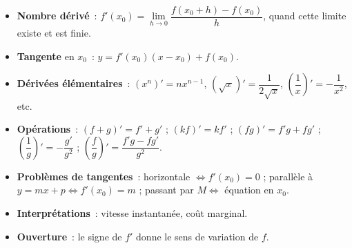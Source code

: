 \documentclass[11pt]{article}
\begin{document}
\begin{aretenir}
\begin{itemize}
\item \textbf{Nombre dérivé}~: $f'(x_0) = \lim\limits_{h \to 0} \dfrac{f(x_0+h)-f(x_0)}{h}$, quand cette limite existe et est finie.
\item \textbf{Tangente} en $x_0$~: $y = f'(x_0)(x - x_0) + f(x_0)$.
\item \textbf{Dérivées élémentaires}~: $(x^n)' = nx^{n-1}$, $(\sqrt{x})' = \dfrac{1}{2\sqrt{x}}$, $\left(\dfrac{1}{x}\right)' = -\dfrac{1}{x^2}$, etc.
\item \textbf{Opérations}~: $(f+g)' = f'+g'$ ; $(kf)' = kf'$ ; $(fg)' = f'g + fg'$ ; $\left(\dfrac{1}{g}\right)' = -\dfrac{g'}{g^2}$ ; $\left(\dfrac{f}{g}\right)' = \dfrac{f'g - fg'}{g^2}$.
\item \textbf{Problèmes de tangentes}~: horizontale $\iff f'(x_0)=0$ ; parallèle à $y=mx+p \iff f'(x_0)=m$ ; passant par $M \iff$ équation en $x_0$.
\item \textbf{Interprétations}~: vitesse instantanée, coût marginal.
\item \textbf{Ouverture}~: le signe de $f'$ donne le sens de variation de $f$.
\end{itemize}
\end{aretenir}
\end{document}
